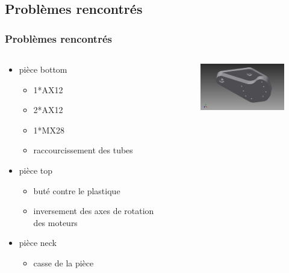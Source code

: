 \subsection{Problèmes rencontrés}
\begin{frame}
  \frametitle{Problèmes rencontrés}
  \begin{columns}[c]
    \begin{column}[c]{0.5\textwidth}
	  \begin{itemize}
	    \item pièce bottom 
	      \begin{itemize}
	        \item 1*AX12
	        \item 2*AX12 
	        \item 1*MX28
	        \item raccourcissement des tubes
	      \end{itemize}
	    \item pièce top
	      \begin{itemize}
	        \item buté contre le plastique
	        \item inversement des axes de rotation des moteurs
	      \end{itemize}
	    \item pièce neck
	      \begin{itemize}
	        \item casse de la pièce
	      \end{itemize}
	  \end{itemize}
    \end{column}
    \begin{column}[c]{0.5\textwidth}
      \begin{figure}
      	\begin{center}
      		\includegraphics[width=5cm]{../img/part_bottom_mx28_v1.jpg}
      	\end{center}      
      \end{figure}
    \end{column}
  \end{columns}
\end{frame}

